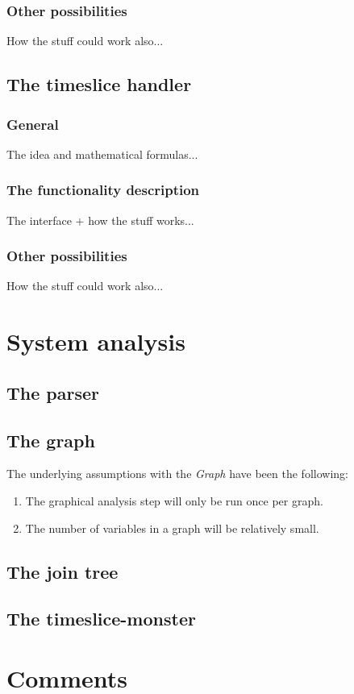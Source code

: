 \documentclass[12pt,a4paper]{report}
\newcommand{\cdatatype}[1]{{\it #1}}
\begin{document}
\subsection{Other possibilities}

How the stuff could work also...


\newpage
\section{The timeslice handler} %
\subsection{General}

The idea and mathematical formulas...

\subsection{The functionality description}

The interface + how the stuff works...

\subsection{Other possibilities}

How the stuff could work also...



\newpage
\chapter{System analysis}
\section{The parser}

\section{The graph}
The underlying assumptions with the \cdatatype{Graph} have been the following:
\begin{enumerate}
\item The graphical analysis step will only be run once per graph.
\item The number of variables in a graph will be relatively small.
\end{enumerate}



\section{The join tree}

\section{The timeslice-monster}


\newpage
\chapter{Comments}


\newpage

\end{document}
